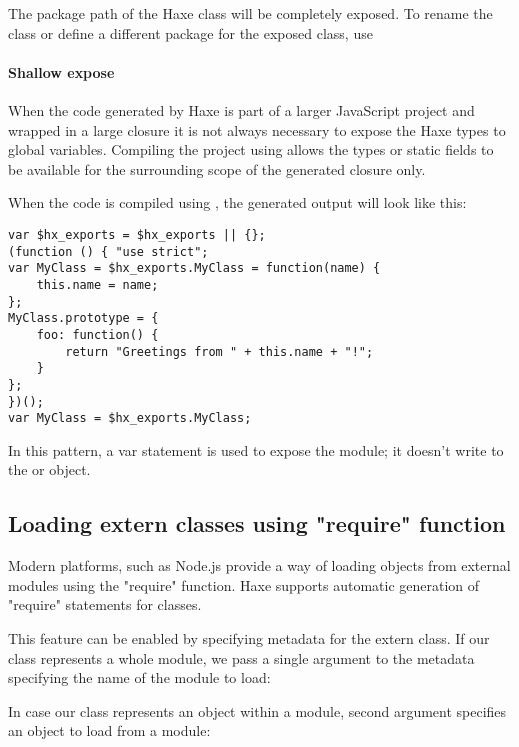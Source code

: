 The package path of the Haxe class will be completely exposed. To rename the class or define a different package for the exposed class, use 

\paragraph{Shallow expose}

When the code generated by Haxe is part of a larger JavaScript project and wrapped in a large closure it is not always necessary to expose the Haxe types to global variables.
Compiling the project using  allows the types or static fields to be available for the surrounding scope of the generated closure only.

When the code is compiled using , the generated output will look like this:

\begin{lstlisting}
var $hx_exports = $hx_exports || {};
(function () { "use strict";
var MyClass = $hx_exports.MyClass = function(name) {
	this.name = name;
};
MyClass.prototype = {
	foo: function() {
		return "Greetings from " + this.name + "!";
	}
};
})();
var MyClass = $hx_exports.MyClass;
\end{lstlisting}

In this pattern, a var statement is used to expose the module; it doesn't write to the  or  object.

\subsection{Loading extern classes using "require" function}
\label{target-javascript-require}

Modern  platforms, such as Node.js provide a way of loading objects
from external modules using the "require" function. Haxe supports automatic generation
of "require" statements for  classes.

This feature can be enabled by specifying  metadata for the extern class. If our  class represents a whole module, we pass a single argument to the  metadata specifying the name of the module to load:


In case our  class represents an object within a module, second  argument specifies an object to load from a module:

